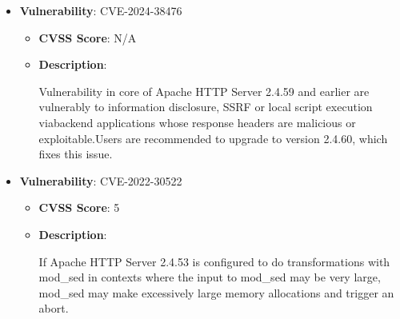 \documentclass{article}
\begin{document}
\begin{itemize}
        \item \textbf{Vulnerability}: CVE-2024-38476
        \begin{itemize}
            \item \textbf{CVSS Score}:  N/A 
            \item \textbf{Description}:
            \parbox[t]{0.9\linewidth}{
                \ttfamily Vulnerability in core of Apache HTTP Server 2.4.59 and earlier are vulnerably to information disclosure, SSRF or local script execution viabackend applications whose response headers are malicious or exploitable.Users are recommended to upgrade to version 2.4.60, which fixes this issue.
            }
        \end{itemize}
    
        \item \textbf{Vulnerability}: CVE-2022-30522
        \begin{itemize}
            \item \textbf{CVSS Score}:  5 
            \item \textbf{Description}:
            \parbox[t]{0.9\linewidth}{
                \ttfamily If Apache HTTP Server 2.4.53 is configured to do transformations with mod\_sed in contexts where the input to mod\_sed may be very large, mod\_sed may make excessively large memory allocations and trigger an abort.
            }
        \end{itemize}
    

\end{itemize}
\end{document}

